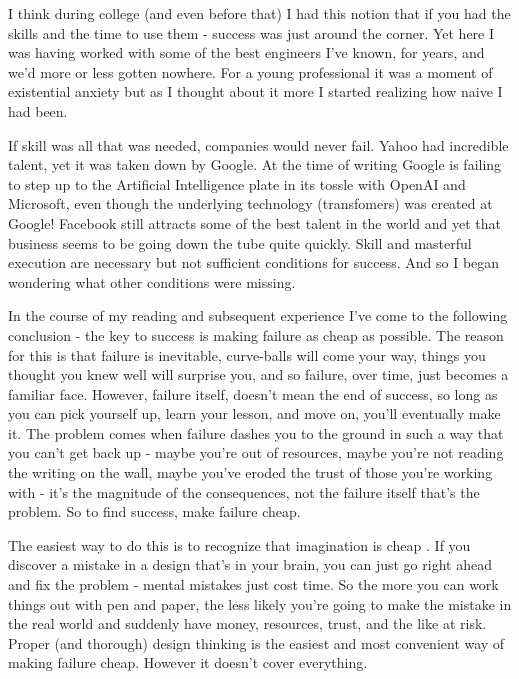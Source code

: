 \documentclass[11pt,a5paper]{book}
\begin{document}
I think during college (and even before that) I had this notion that if you had the skills and the time to use them - success was just around the corner. Yet here I was having worked with some of the best engineers I've known, for years, and we'd more or less gotten nowhere. For a young professional it was a moment of existential anxiety but as I thought about it more I started realizing how naive I had been.
\newline

If skill was all that was needed, companies would never fail. Yahoo had incredible talent, yet it was taken down by Google. At the time of writing Google is failing to step up to the Artificial Intelligence plate in its tossle with OpenAI and Microsoft, even though the underlying technology (transfomers) was created at Google! Facebook still attracts some of the best talent in the world and yet that business seems to be going down the tube quite quickly. Skill and masterful execution are necessary but not sufficient conditions for success. And so I began wondering what other conditions were missing.
\newline

In the course of my reading and subsequent experience I've come to the following conclusion - the key to success is making failure as cheap as possible. The reason for this is that failure is inevitable, curve-balls will come your way, things you thought you knew well will surprise you, and so failure, over time, just becomes a familiar face. However, failure itself, doesn't mean the end of success, so long as you can pick yourself up, learn your lesson, and move on, you'll eventually make it. The problem comes when failure dashes you to the ground in such a way that you can't get back up - maybe you're out of resources, maybe you're not reading the writing on the wall, maybe you've eroded the trust of those you're working with - it's the magnitude of the consequences, not the failure itself that's the problem. So to find success, make failure cheap.
\newline

The easiest way to do this is to recognize that imagination is cheap \cite{macmillan}. If you discover a mistake in a design that's in your brain, you can just go right ahead and fix the problem - mental mistakes just cost time. So the more you can work things out with pen and paper, the less likely you're going to make the mistake in the real world and suddenly have money, resources, trust, and the like at risk. Proper (and thorough) design thinking is the easiest and most convenient way of making failure cheap. However it doesn't cover everything.
\newline
\end{document}
